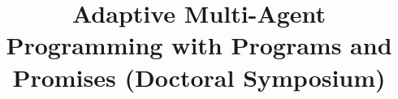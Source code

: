 \documentclass[conference]{IEEEtran}
\begin{document}
\title{Adaptive Multi-Agent Programming with Programs and Promises
(Doctoral Symposium)}

\author{
}

\maketitle
\end{document}
